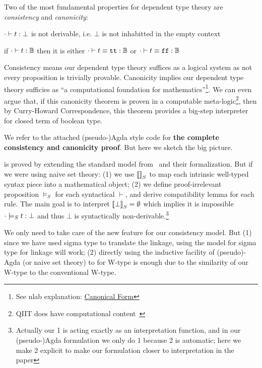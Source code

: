 Two of the most fundamental properties for dependent type theory are \textit{consistency} and \textit{canonicity}:
\begin{theorem}[Consistency]
  $ {\cdot} \vdash {t} : {\bot} $ is not derivable, i.e. $\bot$ is not inhabitted in the empty context
\end{theorem}
\begin{theorem}[Canonicity]
  if $ {\cdot} \vdash {t} : {\mathbb{B}} $ then it is either $ {\cdot} \vdash {t \equiv \ensuremath{\texttt{tt}}} : {\mathbb{B}} $ or $ {\cdot} \vdash {t \equiv \ensuremath{\texttt{ff}}} : {\mathbb{B}} $
\end{theorem}
Consistency means our dependent type theory suffices as a logical system as not every proposition is trivially provable. Canonicity implies our dependent type theory sufficies as ``a computational foundation for mathematics''\footnote{See nlab explanation: \href{https://ncatlab.org/nlab/show/canonical+form}{Canonical Form}}. We can even argue that, if this canonicity theorem is proven in a computable meta-logic\footnote{QIIT does have computational content~\cite{altkap2016}}, 
then by Curry-Howard Correspondence, this theorem provides a big-step interpreter for closed term of boolean type. 

We refer to the attached (pseudo-)Agda style code for \textbf{the complete consistency and canonicity proof}. But here we sketch the big picture.




 is proved by extending the standard model from~\citet{altkap2016,kaposi2017type, kaposi2019gluing} and their formalization. But if we were using naive set theory: (1) we use ${\llbracket {} \rrbracket}_S$ to map each intrinsic well-typed syntax piece into a mathematical object; (2) we define proof-irrelevant proposition $\models_S$ for each syntactical $\vdash$, and derive compatibility lemma for each rule. The main goal is to interpret ${\llbracket {\bot} \rrbracket}_S = \emptyset$ which implies it is impossible ${ {\cdot} \models_S {t} : {\bot} }$ and thus $\bot$ is syntactically non-derivable.\footnote{Actually our 1 is acting exactly as an interpretation function, and in our (pseudo-)Agda formulation we only do 1 because 2 is automatic; here we make 2 explicit to make our formulation closer to interpretation in the paper}

We only need to take care of the new feature for our consistency model. But (1) since we have used sigma type to translate the linkage, using the model for sigma type for linkage will work; (2) directly using the inductive facility of (pseudo)-Agda (or naive set theory) to for W-type is enough due to the similarity of our W-type to the conventional W-type.

